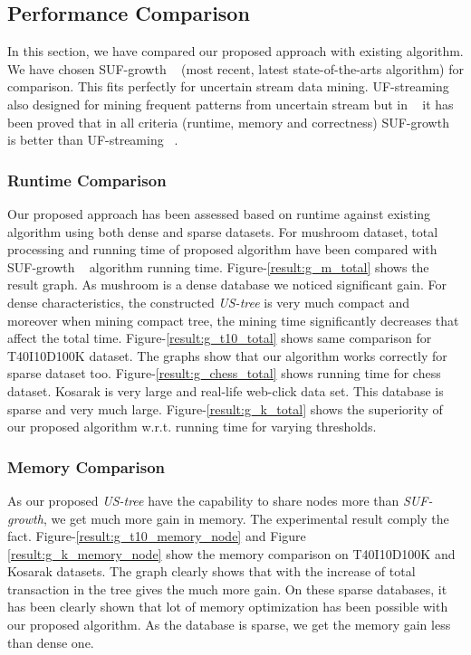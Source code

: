 \documentclass[conference]{IEEEtran}
\begin{document}
\subsection{Performance Comparison}
In this section, we have compared our proposed approach with existing algorithm. We have chosen SUF-growth ~\cite{DBLP:conf/icde/LeungH09} (most recent, latest state-of-the-arts algorithm) for comparison. This fits perfectly for uncertain stream data mining. UF-streaming also designed for mining frequent patterns from uncertain stream but in ~\cite{DBLP:conf/icde/LeungH09} it has been proved that in all criteria (runtime, memory and correctness) SUF-growth ~\cite{DBLP:conf/icde/LeungH09} is better than UF-streaming ~\cite{DBLP:conf/icde/LeungH09}.
            
\subsubsection{Runtime Comparison}
Our proposed approach has been assessed based on runtime against existing algorithm using both dense and sparse datasets. For mushroom dataset, total processing and running time of proposed algorithm have been compared with SUF-growth ~\cite{DBLP:conf/icde/LeungH09} algorithm running time. Figure-\ref{result:g_m_total} shows the result graph. As mushroom is a dense database we noticed significant gain. For dense characteristics, the constructed \emph{US-tree} is very much compact and moreover when mining compact tree, the mining time significantly decreases that affect the total time. Figure-\ref{result:g_t10_total} shows same comparison for T40I10D100K dataset. The graphs show that our algorithm works correctly for sparse dataset too. Figure-\ref{result:g_chess_total} shows running time for chess dataset. Kosarak is very large and real-life web-click data set. This database is sparse and very much large. Figure-\ref{result:g_k_total} shows the superiority of our proposed algorithm w.r.t. running time for varying thresholds.
       
\subsubsection{Memory Comparison}
As our proposed \emph{US-tree} have the capability to share nodes more than \emph{SUF-growth}, we get much more gain in memory. The experimental result comply the fact. Figure-\ref{result:g_t10_memory_node} and Figure \ref{result:g_k_memory_node} show the memory comparison on T40I10D100K and Kosarak datasets. The graph clearly shows that with the increase of total transaction in the tree gives the much more gain. On these sparse databases, it has been clearly shown that lot of memory optimization has been possible with our proposed algorithm. As the database is sparse, we get the memory gain less than dense one.
\end{document}
